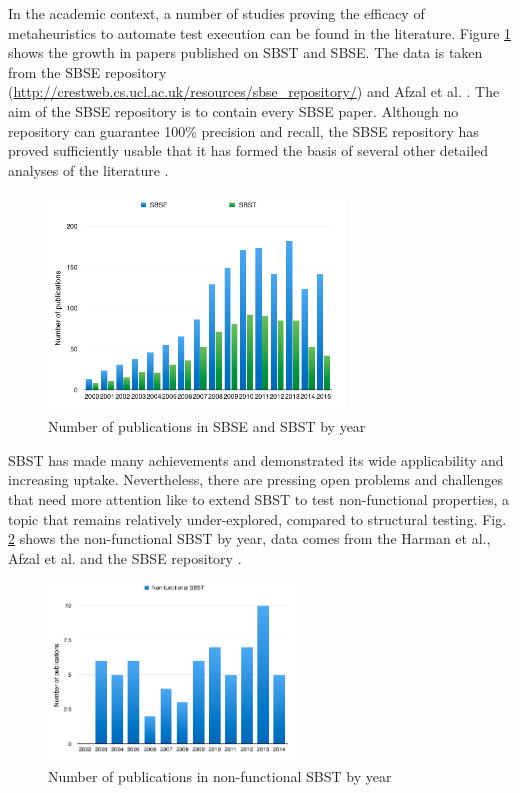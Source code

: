 \documentclass[espaco=umemeio,chapter=TITLE,twoside,openright]{abnt}
\begin{document}
In the academic context, a number of studies proving the efficacy of metaheuristics to automate test execution can be found in the literature. Figure \ref{fig:sbsesbst}  shows the growth in papers published on SBST and SBSE. The data is taken from the SBSE repository (\url{http://crestweb.cs.ucl.ac.uk/resources/sbse_repository/}) and Afzal et al. \cite{Afzal2009a} \cite{Harman2015}.
The aim of the SBSE repository is to contain every SBSE paper. Although no repository can guarantee 100\% precision and recall, the SBSE repository has proved sufficiently usable that it has formed the basis of several other detailed analyses of the literature \cite{Harman2015}.


\begin{figure}[h]
\centering
\includegraphics[width=0.7\textwidth]{./images/publications1.png}
\caption{Number of publications in SBSE and SBST by year \cite{Afzal2009a} \cite{Harman2015}}
\label{fig:sbsesbst}
\end{figure}

SBST has made many achievements and demonstrated its wide applicability and increasing uptake. Nevertheless, there are pressing open problems and challenges that need more attention like to extend SBST to test non-functional properties, a topic that remains relatively under-explored, compared to structural testing.  Fig. \ref{fig:nonfunctional} shows the non-functional SBST by year, data comes from the Harman et al., Afzal et al. and the SBSE repository \cite{Aleti2016} \cite{Harman2015}.


\begin{figure}[h]
\centering
\includegraphics[width=0.6\textwidth]{./images/nonfunctional.png}
\caption{Number of publications in non-functional SBST by year \cite{Afzal2009a} \cite{Harman2015} }
\label{fig:nonfunctional}
\end{figure}
\end{document}
